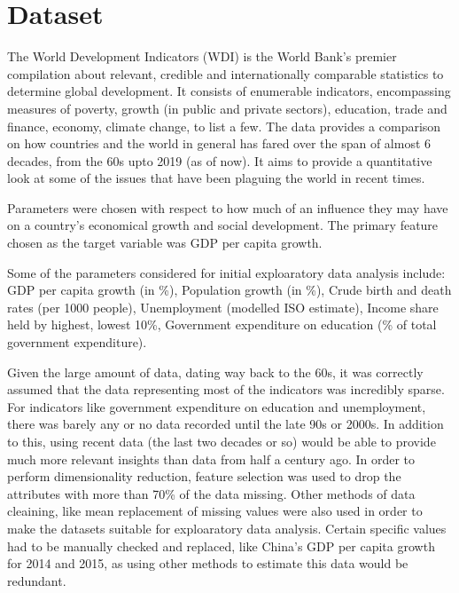 \documentclass[conference]{IEEEtran}
\begin{document}
\section{Dataset}
The World Development Indicators (WDI) is the World Bank’s premier compilation 
about relevant, credible and internationally comparable statistics to determine 
global development. It consists of enumerable indicators, encompassing measures 
of poverty, growth (in public and private sectors), education, trade and finance, 
economy, climate change, to list a few. The data provides a comparison on how 
countries and the world in general has fared over the span of almost 6 decades, 
from the 60s upto 2019 (as of now). It aims to provide a quantitative look at 
some of the issues that have been plaguing the world in recent times.

Parameters were chosen with respect to how much of an influence they may have 
on a country's economical growth and social development. The primary feature chosen
as the target variable was GDP per capita growth.

Some of the parameters considered for initial exploaratory data analysis include: 
GDP per capita growth (in \%), 
Population growth (in \%), 
Crude birth and death rates (per 1000 people), 
Unemployment (modelled ISO estimate), 
Income share held by highest, lowest 10\%, 
Government expenditure on education (\% of total government expenditure).


Given the large amount of data, dating way back to the 60s, it was correctly assumed that the data representing most of the indicators was incredibly sparse. For indicators like government expenditure on education and unemployment, there was barely any or no data recorded until the late 90s or 2000s. In addition to this, using recent data (the last two decades or so) would be able to provide much more relevant insights than data from half a century ago. In order to perform dimensionality reduction, feature selection was used to drop the attributes with more than 
70\% of the data missing. Other methods of data cleaining, like mean replacement of missing values were also used in order to make the datasets suitable for exploaratory data analysis. Certain specific values had to be manually checked and replaced, like China's GDP per capita growth for 2014 and 2015, as using other methods to estimate this data would be redundant.
\end{document}
